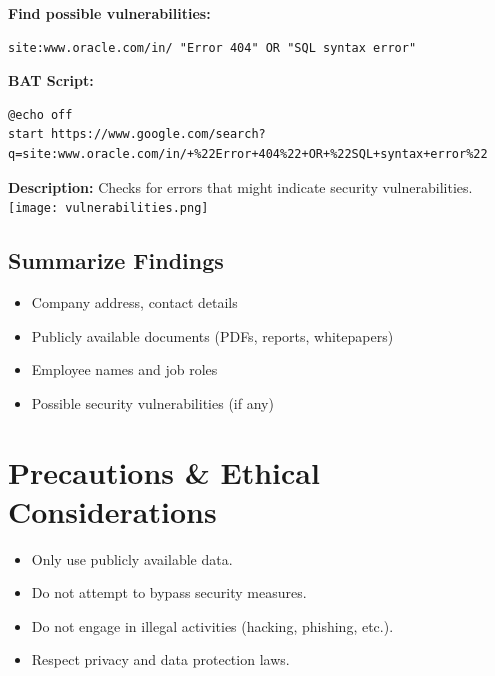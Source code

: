 \documentclass{article}
\begin{document}
\textbf{Find possible vulnerabilities:}
\begin{lstlisting}
site:www.oracle.com/in/ "Error 404" OR "SQL syntax error"
\end{lstlisting}
\textbf{BAT Script:}
\begin{lstlisting}
@echo off
start https://www.google.com/search?q=site:www.oracle.com/in/+%22Error+404%22+OR+%22SQL+syntax+error%22
\end{lstlisting}
\textbf{Description:} Checks for errors that might indicate security vulnerabilities.
\texttt{[image: vulnerabilities.png]}

\subsection{Summarize Findings}
\begin{itemize}
    \item Company address, contact details
    \item Publicly available documents (PDFs, reports, whitepapers)
    \item Employee names and job roles
    \item Possible security vulnerabilities (if any)
\end{itemize}

\section{Precautions \& Ethical Considerations}
\begin{itemize}
    \item Only use publicly available data.
    \item Do not attempt to bypass security measures.
    \item Do not engage in illegal activities (hacking, phishing, etc.).
    \item Respect privacy and data protection laws.
\end{itemize}
\end{document}
